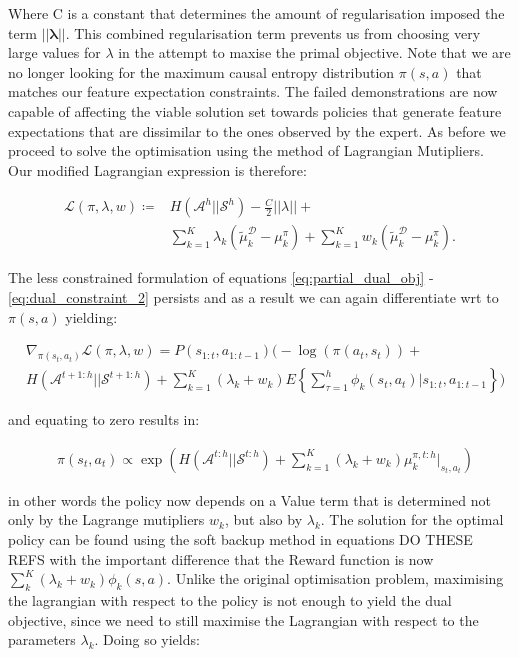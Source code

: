 \documentclass[letterpaper]{article}
\begin{document}
Where C is a constant that determines the amount of regularisation imposed the term $||\mathbf{\lambda}||$. This combined regularisation term prevents us from choosing very large values for $\lambda$ in the attempt to maxise the primal objective. Note that we are no longer looking for the maximum causal entropy distribution $\pi(s,a)$ that matches our feature expectation constraints. The failed demonstrations are now capable of affecting the viable solution set towards policies that generate feature expectations that are dissimilar to the ones observed by the expert. As before we proceed to solve the optimisation using the method of Lagrangian Mutipliers. Our modified Lagrangian expression is therefore:

\begin{align}
\label{eq:partial_lagrangian_failure}
\mathcal{L}(\pi,\lambda,w)\coloneqq & H(\mathcal{A}^h||\mathcal{S}^h) - \frac{C}{2}||\lambda|| + \\
&\sum_{k=1}^K\lambda_k (\widetilde{\mu}^{\mathcal{D}}_k-\mu^{\pi}_k) + \sum_{k=1}^Kw_k(\widetilde{\mu}^{\mathcal{D}}_k-\mu^{\pi}_k).
\end{align}

The less constrained formulation of equations \eqref{eq:partial_dual_obj} - \eqref{eq:dual_constraint_2} persists and as a result we can
again differentiate wrt to $\pi(s,a)$ yielding:

\begin{equation}
 \begin{split}
 &\nabla_{\pi(s_t,a_t)}\mathcal{L}(\pi,\lambda,w) = P(s_{1:t},a_{1:t-1})\Bigg(-\log(\pi(a_t,s_t))+ \\
& H(\mathcal{A}^{t+1:h}||\mathcal{S}^{t+1:h})
 +\sum_{k=1}^K (\lambda_k + w_k)E\left\{\sum_{\tau=1}^h \phi_k(s_t,a_t)|s_{1:t},a_{1:t-1}\right\}\Bigg) \label{eqn:lagragian_derivative_failure}
 \end{split}
\end{equation}

and equating to zero results in:

\begin{equation}
\label{eq:policy_prop}
	\begin{split}
	&\pi(s_t,a_t) \propto \exp\left(H(\mathcal{A}^{t:h}||\mathcal{S}^{t:h})+\sum^K_{k=1}(\lambda_k + w_k)\mu_k^{\pi,t:h}|_{s_t,a_t}\right)
	\end{split}
\end{equation}



in other words the policy now depends on a Value term that is determined not only by the Lagrange mutipliers $w_k$, but also by $\lambda_k$.
The solution for the optimal policy can be found using the soft backup method in equations DO THESE REFS
with the important difference that the Reward function is now $\sum_k^K(\lambda_k + w_k)\phi_k(s,a)$. Unlike the original optimisation problem,
maximising the lagrangian with respect to the policy is not enough to yield the dual objective, since we need to still maximise the Lagrangian with respect to the parameters $\lambda_k$. Doing so yields:
\end{document}
